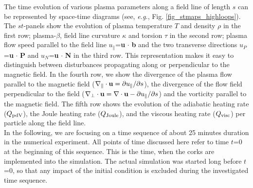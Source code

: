 \documentclass{aa}
\begin{document}
The time evolution of various plasma parameters along a field line of length $s$ can be represented by space-time diagrams (see, {\emph{e.g.}}, Fig. \ref{fig_stmaps_highloops}). %
The $st$-panels show the evolution of plasma temperature $T$ and density $\rho$ in the first row; plasma-$\beta$, field line curvature $\kappa$ and torsion $\tau$ in the second row; plasma flow speed parallel to the field line $u_{\parallel}$={\bf{u}} $\cdot$ {\bf{b}} and the two transverse directions $u_P$={\bf{u}} $\cdot$ {\bf{P}} and $u_N$={\bf{u}} $\cdot$ {\bf{N}} in the third row. This representation makes it easy to distinguish between disturbances propagating along or perpendicular to the magnetic field. In the fourth row, we show the divergence of the plasma flow parallel to the magnetic field ($\nabla_{\parallel} \cdot {\bf{u}}=\partial u_{\parallel}/\partial s$), the divergence of the flow field perpendicular to the field ($\nabla_{\perp} \cdot {\bf{u}} = \nabla \cdot {\bf{u}} - \partial u_{\parallel}/\partial s$) and the vorticity parallel to the magnetic field. The fifth row shows the evolution of the adiabatic heating rate ($Q_{\rm{pdV}}$), the Joule heating rate ($Q_{\rm{Joule}}$), and the viscous heating rate ($Q_{{\rm{visc}}}$) per particle along the field line.\\ 


In the following, we are focusing on a time sequence of about 25 minutes duration in the numerical experiment. All points of time discussed here refer to time $t$=0 at the beginning of this sequence. This is the time, when the corks are implemented into the simulation. The actual simulation was started long before $t$=0, so that any impact of the initial condition is excluded during the investigated time sequence.






\end{document}
